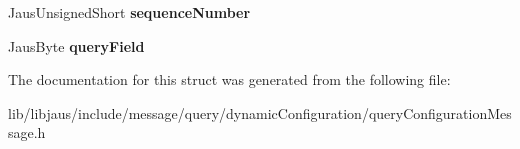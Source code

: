 \begin{DoxyCompactItemize}
\item 
\hypertarget{struct_query_configuration_message_struct_a86633f685cc285fbdb6792cc19fb2149}{\-Jaus\-Unsigned\-Short {\bfseries sequence\-Number}}\label{struct_query_configuration_message_struct_a86633f685cc285fbdb6792cc19fb2149}

\item 
\hypertarget{struct_query_configuration_message_struct_a1a23dcd76c40f81de275ddb1894397a7}{\-Jaus\-Byte {\bfseries query\-Field}}\label{struct_query_configuration_message_struct_a1a23dcd76c40f81de275ddb1894397a7}

\end{DoxyCompactItemize}


\-The documentation for this struct was generated from the following file\-:\begin{DoxyCompactItemize}
\item 
lib/libjaus/include/message/query/dynamic\-Configuration/query\-Configuration\-Message.\-h\end{DoxyCompactItemize}
